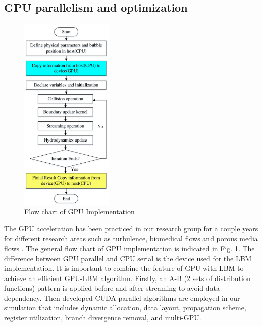 \documentclass[10pt]{elsarticle}
\begin{document}
\subsection{GPU parallelism and optimization}
\label{se:res}
\begin{figure}
\centering
\includegraphics[width=0.4\textwidth]{gpuflow.pdf}
\caption{Flow chart of GPU Implementation}
\label{fig:gpuflow}
\end{figure}
\setlength{\parindent}{2em} 
The GPU acceleration has been practiced in our research group for a couple years for different research areas such as turbulence\cite{rf:Yu_Chen14_cma}, biomedical flows\cite{rf:Yu15_cf} and porous media flows \cite{rf:Yu_An17_IJHMT,rf:Yu_An17_JPSE}. The general flow chart of GPU implementation is indicated in Fig. \ref{fig:gpuflow}. The difference between GPU parallel and CPU serial is the device used for the LBM implementation.  It is important to combine the feature of GPU with LBM to achieve an efficient GPU-LBM algorithm. Firstly, an A-B (2 sets of distribution functions) pattern is applied before and after streaming to avoid data dependency. Then developed CUDA parallel algorithms are employed in our simulation that includes dynamic allocation, data layout, propagation scheme, register utilization, branch divergence removal, and multi-GPU.  
\end{document}
